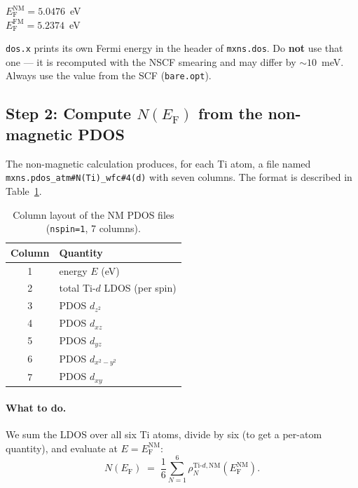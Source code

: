 \documentclass[11pt,a4paper]{article}
\newcommand{\Ef}{E_{\mathrm{F}}}
\newcommand{\NEf}{N(\Ef)}
\begin{document}
\begin{resultbox}
$\Ef^{\text{NM}} = 5.0476$~eV \\
$\Ef^{\text{FM}} = 5.2374$~eV
\end{resultbox}

\begin{warningbox}
\texttt{dos.x} prints its own Fermi energy in the header of
\texttt{mxns.dos}. Do \textbf{not} use that one — it is recomputed with
the NSCF smearing and may differ by $\sim 10$~meV. Always use the value
from the SCF (\texttt{bare.opt}).
\end{warningbox}

\subsection{Step 2: Compute $\NEf$ from the non-magnetic PDOS}

The non-magnetic calculation produces, for each Ti atom, a file named
\verb|mxns.pdos_atm#N(Ti)_wfc#4(d)| with seven columns. The format is
described in Table~\ref{tab:pdos-NM}.
%
\begin{table}[h!]
\small
\centering
\begin{tabular}{c l}
\toprule
Column & Quantity \\
\midrule
1 & energy $E$ (eV) \\
2 & total Ti-$d$ LDOS (per spin) \\
3 & PDOS $d_{z^2}$ \\
4 & PDOS $d_{xz}$ \\
5 & PDOS $d_{yz}$ \\
6 & PDOS $d_{x^2-y^2}$ \\
7 & PDOS $d_{xy}$ \\
\bottomrule
\end{tabular}
\caption{Column layout of the NM PDOS files (\texttt{nspin=1}, 7
columns).}
\label{tab:pdos-NM}
\end{table}

\paragraph{What to do.} We sum the LDOS over all six Ti atoms, divide by
six (to get a per-atom quantity), and evaluate at $E = \Ef^{\text{NM}}$:
%
\begin{equation}
    \NEf \;=\; \frac{1}{6}\sum_{N=1}^{6}
    \rho^{\text{Ti-}d, \text{NM}}_{N}(\Ef^{\text{NM}}).
    \label{eq:NEf}
\end{equation}
\end{document}
